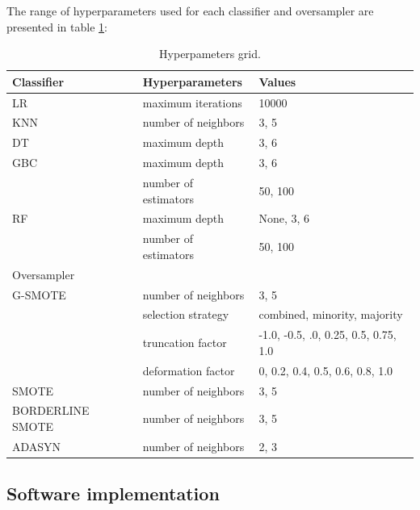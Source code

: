\documentclass[remotesensing,article,submit,moreauthors,pdftex]{Definitions/mdpi}
\begin{document}
The range of hyperparameters used for each classifier and oversampler are
presented in table \ref{tab:grid}:

\begin{table}[H]
	\centering
	\begin{tabular}{lll}
		\toprule
		Classifier       & Hyperparameters      & Values                       \\
		\hline
		LR               & maximum iterations   & 10000                        \\
		KNN              & number of neighbors  & {3, 5}                       \\
		DT               & maximum depth        & {3, 6}                       \\
		GBC              & maximum depth        & {3, 6}                       \\
		                 & number of estimators & {50, 100}                    \\
		RF               & maximum depth        & {None, 3, 6}                 \\
		                 & number of estimators & {50, 100}                    \\
		\toprule
		Oversampler      &                      &                              \\
		\hline
		G-SMOTE          & number of neighbors  & {3, 5}                       \\
		                 & selection strategy   & combined, minority, majority \\
		                 & truncation factor    & {-1.0, -0.5, .0, 0.25, 0.5,
				0.75, 1.0}                                                             \\
		                 & deformation factor   & {0, 0.2, 0.4, 0.5, 0.6, 0.8,
				1.0}                                                                   \\
		SMOTE            & number of neighbors  & {3, 5}                       \\
		BORDERLINE SMOTE & number of neighbors  & {3, 5}                       \\
		ADASYN           & number of neighbors  & {2, 3}                       \\
		\bottomrule
	\end{tabular}
	\caption{\label{tab:grid}Hyperpameters grid.}
\end{table}

\subsection{Software implementation}
\end{document}

